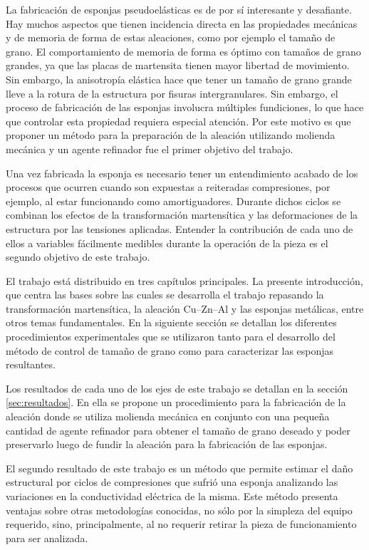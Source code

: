 \documentclass[a4paper,12pt,fleqn,twoside,openany]{book}
\begin{document}
La fabricación de esponjas pseudoelásticas es de por sí interesante y desafiante. Hay muchos aspectos que tienen incidencia directa en las propiedades  mecánicas y de memoria de forma de estas aleaciones, como por ejemplo el tamaño de grano. El comportamiento de memoria de forma es óptimo con tamaños de grano grandes, ya que las placas de martensita tienen mayor libertad de movimiento. Sin embargo, la anisotropía elástica hace que tener un tamaño de grano grande lleve a la rotura de la estructura por fisuras intergranulares.
Sin embargo, el proceso de fabricación de las esponjas involucra múltiples fundiciones, lo que hace que controlar esta propiedad requiera especial atención. Por este motivo es que proponer un método para la preparación de la aleación utilizando molienda mecánica y un agente refinador fue el primer objetivo del trabajo.

Una vez fabricada la esponja es necesario tener un entendimiento acabado de los procesos que ocurren cuando son expuestas a reiteradas compresiones, por ejemplo, al estar funcionando como amortiguadores. Durante dichos ciclos se combinan los efectos de la transformación martensítica y las deformaciones de la estructura por las tensiones aplicadas. Entender la contribución de cada uno de ellos a variables fácilmente medibles durante la operación de la pieza es el segundo objetivo de este trabajo.

El trabajo está distribuido en tres capítulos principales. La presente introducción, que centra las bases sobre las cuales se desarrolla el trabajo repasando la transformación martensítica, la aleación Cu–Zn–Al y las esponjas metálicas, entre otros temas fundamentales. En la siguiente sección se detallan los diferentes procedimientos experimentales que se utilizaron tanto para el desarrollo del método de control de tamaño de grano como para caracterizar las esponjas resultantes.

Los resultados de cada uno de los ejes de este trabajo se detallan en la sección \ref{sec:resultados}. En ella se propone un procedimiento para la fabricación de la aleación donde se utiliza molienda mecánica en conjunto con una pequeña cantidad de agente refinador para obtener el tamaño de grano deseado y poder preservarlo luego de fundir la aleación para la fabricación de las esponjas.

El segundo resultado de este trabajo es un método que permite estimar el daño estructural por ciclos de compresiones que sufrió una esponja analizando las variaciones en la conductividad eléctrica de la misma. Este método presenta ventajas sobre otras metodologías conocidas, no sólo por la simpleza del equipo requerido, sino, principalmente, al no requerir retirar la pieza de funcionamiento para ser analizada.
\end{document}
